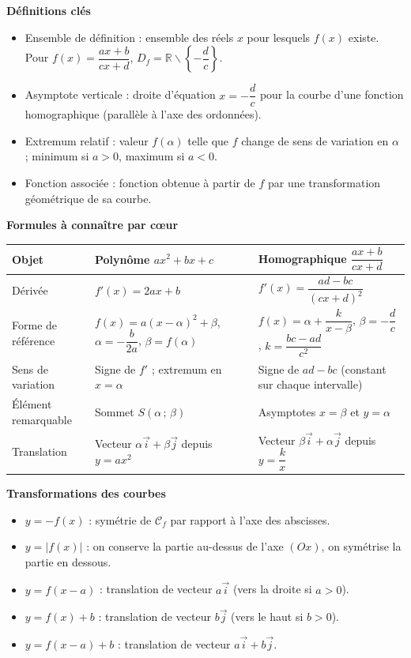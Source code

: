 \documentclass[11pt]{article}
\newcommand{\cle}[1]{{\popxbold\color{popdark}#1}}
\def\setminus{\mathbin{\backslash}}\let\smallsetminus\setminus
\begin{document}
\begin{bilan}
\textbf{Définitions clés}
\begin{itemize}
  \item \cle{Ensemble de définition} : ensemble des réels $x$ pour lesquels $f(x)$ existe. Pour $f(x)=\dfrac{ax+b}{cx+d}$, $D_f=\mathbb{R}\setminus\left\{-\dfrac{d}{c}\right\}$.
  \item \cle{Asymptote verticale} : droite d'équation $x=-\dfrac{d}{c}$ pour la courbe d'une fonction homographique (parallèle à l'axe des ordonnées).
  \item \cle{Extremum relatif} : valeur $f(\alpha)$ telle que $f$ change de sens de variation en $\alpha$ ; minimum si $a>0$, maximum si $a<0$.
  \item \cle{Fonction associée} : fonction obtenue à partir de $f$ par une transformation géométrique de sa courbe.
\end{itemize}

\textbf{Formules à connaître par cœur}
\begin{center}
\begin{tabularx}{\linewidth}{|l|X|X|}
\hline
\rowcolor{popblueL} \textbf{Objet} & \textbf{Polynôme $ax^2+bx+c$} & \textbf{Homographique $\dfrac{ax+b}{cx+d}$} \\
\hline
Dérivée & $f'(x)=2ax+b$ & $f'(x)=\dfrac{ad-bc}{(cx+d)^2}$ \\
\hline
Forme de référence & $f(x)=a(x-\alpha)^2+\beta$, $\alpha=-\dfrac{b}{2a}$, $\beta=f(\alpha)$ & $f(x)=\alpha+\dfrac{k}{x-\beta}$, $\beta=-\dfrac{d}{c}$, $k=\dfrac{bc-ad}{c^2}$ \\
\hline
Sens de variation & Signe de $f'$ ; extremum en $x=\alpha$ & Signe de $ad-bc$ (constant sur chaque intervalle) \\
\hline
Élément remarquable & Sommet $S(\alpha\,;\,\beta)$ & Asymptotes $x=\beta$ et $y=\alpha$ \\
\hline
Translation & Vecteur $\alpha\vec{i}+\beta\vec{j}$ depuis $y=ax^2$ & Vecteur $\beta\vec{i}+\alpha\vec{j}$ depuis $y=\dfrac{k}{x}$ \\
\hline
\end{tabularx}
\end{center}

\textbf{Transformations des courbes}
\begin{itemize}
  \item $y=-f(x)$ : symétrie de $\mathcal{C}_f$ par rapport à l'axe des abscisses.
  \item $y=|f(x)|$ : on conserve la partie au-dessus de l'axe $(Ox)$, on symétrise la partie en dessous.
  \item $y=f(x-a)$ : translation de vecteur $a\vec{i}$ (vers la droite si $a>0$).
  \item $y=f(x)+b$ : translation de vecteur $b\vec{j}$ (vers le haut si $b>0$).
  \item $y=f(x-a)+b$ : translation de vecteur $a\vec{i}+b\vec{j}$.
\end{itemize}


\end{bilan}
\end{document}
